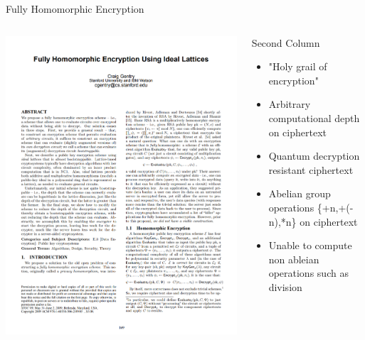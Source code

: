 \documentclass[aspectratio=169]{beamer}
\begin{document}
    \begin{frame}{Fully Homomorphic Encryption}
      \begin{columns}
        \begin{column}{0.5\textwidth}
          \includegraphics[width=0.8\linewidth]{gentry.png}
        \end{column}
        \begin{column}{0.5\textwidth}
          Second Column\\[.2cm]
          \begin{itemize}
            \item "Holy grail of encryption"
            \item Arbitrary computational depth on ciphertext
            \item Quantum decryption resistant ciphertext
            \item Abelian group operations \{+n,+(-n),*n\} on ciphertext
            \item Unable to compute non ableian operations such as division
          \end{itemize}
        \end{column}
      \end{columns}
    \end{frame}
\end{document}
